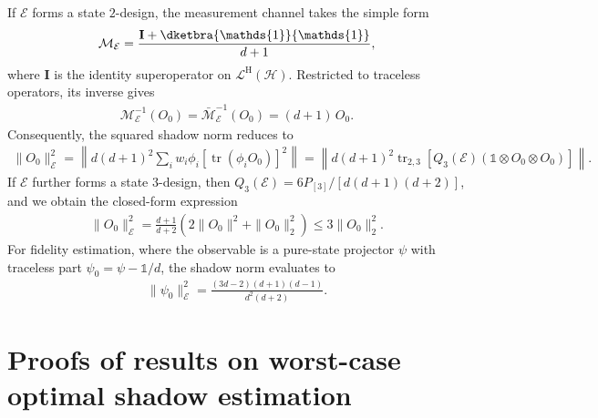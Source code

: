 \documentclass[aps,pra,twocolumn,nofootinbib,superscriptaddress,10pt]{revtex4-2}
\newcommand{\dproj}[1]{\dketbra{#1}{#1}}
\DeclareMathOperator{\tr}{tr}
\newcommand{\bfI}{\mathbf{I}}
\newcommand{\bbone}{\mathds{1}}
\newcommand{\caE}{\mathcal{E}}
\newcommand{\caH}{\mathcal{H}}
\newcommand{\caL}{\mathcal{L}}
\newcommand{\caM}{\mathcal{M}}
\newcommand{\rmH}{\mathrm{H}}
\newcommand{\bcaM}{\bar{\mathcal{M}}}
\begin{document}
If $\caE$ forms a state $2$-design, the measurement channel takes the simple form
\begin{align}
    \caM_\caE = \frac{\bfI + \dproj{\bbone}}{d+1},
\end{align}
where $\bfI$ is the identity superoperator on $\caL^{\rmH}(\caH)$. Restricted to traceless operators, its inverse gives
\begin{align}
    \caM_\caE^{-1}(O_0) = \bcaM_\caE^{-1}(O_0) = (d+1)\, O_0.
\end{align}
Consequently, the squared shadow norm reduces to
\begin{align}
    \|O_0\|_\caE^2 = \left\| d(d+1)^2 \sum_i w_i \phi_i \left[ \tr(\phi_i O_0) \right]^2 \right\|=\left\|d(d+1)^2\tr_{2,3}\left[Q_3(\caE) \left(\bbone \otimes O_0\otimes O_0\right)\right]\right\|.
\end{align}
If $\caE$ further forms a state $3$-design, then $Q_3(\caE)=6P_{[3]}/[d(d+1)(d+2)]$, and  we obtain the closed-form expression
\begin{align}
    \|O_0\|_\caE^2 = \frac{d+1}{d+2}\left( 2\|O_0\|^2 + \|O_0\|_2^2 \right) \le 3\|O_0\|_2^2.
\end{align}
For fidelity estimation, where the observable is a pure-state projector $\psi$ with traceless part $\psi_0 = \psi - \bbone/d $, the shadow norm evaluates to
\begin{align}
    \|\psi_0\|_\caE^2 = \frac{(3d-2)(d+1)(d-1)}{d^2(d+2)}. \label{eq:3design_pure}
\end{align}




\section{Proofs of results on worst-case optimal shadow estimation}
\end{document}
